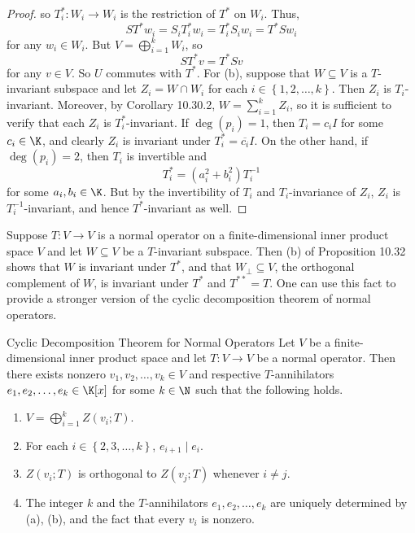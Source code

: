 \documentclass[linearalgebra]{subfiles}
\begin{document}
\begin{proof}
        so $T_i^{*} : W_i\to W_i$ is the restriction of $T^{*}$ on $W_i$. Thus,
        \begin{equation*}
            ST^{*} w_i = S_iT_i^{*} w_i = T_i^{*}S_iw_i = T^{*} Sw_i
        \end{equation*}
        for any $w_i\in W_i$. But $V=\bigoplus^{k}_{i=1} W_i$, so
        \begin{equation*}
            ST^{*} v = T^{*} Sv
        \end{equation*}
        for any $v\in V$. So $U$ commutes with $T^{*}$. For (b), suppose that $W\subseteq V$ is a $T$-invariant subspace and let $Z_i = W\cap W_i$ for each $i\in\left\lbrace 1,2,\ldots,k \right\rbrace$. Then $Z_i$ is $T_i$-invariant. Moreover, by Corollary 10.30.2, $W = \sum^{k}_{i=1} Z_i$, so it is sufficient to verify that each $Z_i$ is $T_i^{*}$-invariant. If $\deg\left( p_i \right) = 1$, then $T_i = c_iI$ for some $c_i\in\K$, and clearly $Z_i$ is invariant under $T_i^{*} = \overline{c_i}I$. On the other hand, if $\deg\left( p_i \right) = 2$, then $T_i$ is invertible and
        \begin{equation*}
            T_i^{*}  = \left( a_i^{2} +b_i^{2}  \right) T_i^{-1} 
        \end{equation*}
        for some $a_i,b_i\in\K$. But by the invertibility of $T_i$ and $T_i$-invariance of $Z_i$, $Z_i$ is $T_i^{-1}$-invariant, and hence $T^{*}$-invariant as well.
    \end{proof}

    \begin{remark}
        Suppose $T:V\to V$ is a normal operator on a finite-dimensional inner product space $V$ and let $W\subseteq V$ be a $T$-invariant subspace. Then (b) of Proposition 10.32 shows that $W$ is invariant under $T^{*}$, and that $W_\perp\subseteq V$, the orthogonal complement of $W$, is invariant under $T^{*}$ and $T^{**} = T$. One can use this fact to provide a stronger version of the cyclic decomposition theorem of normal operators.
    \end{remark}

    \begin{theorem}{Cyclic Decomposition Theorem for Normal Operators}
        Let $V$ be a finite-dimensional inner product space and let $T:V\to V$ be a normal operator. Then there exists nonzero $v_1,v_2,\ldots,v_k\in V$ and respective $T$-annihilators $e_1,e_2,\ldots,e_k\in\K[x]$ for some $k\in\N$ such that the following holds.
        \begin{enumerate}
            \item $V=\bigoplus^{k}_{i=1} Z\left( v_i;T \right)$.
            \item For each $i\in\left\lbrace 2,3,\ldots,k \right\rbrace$, $e_{i+1}\mid e_i$.
            \item $Z\left( v_i;T \right)$ is orthogonal to $Z\left( v_j;T \right)$ whenever $i\neq j$.
            \item The integer $k$ and the $T$-annihilators $e_1,e_2,\ldots,e_k$ are uniquely determined by (a), (b), and the fact that every $v_i$ is nonzero.
        \end{enumerate}
    \end{theorem}
\end{document}
